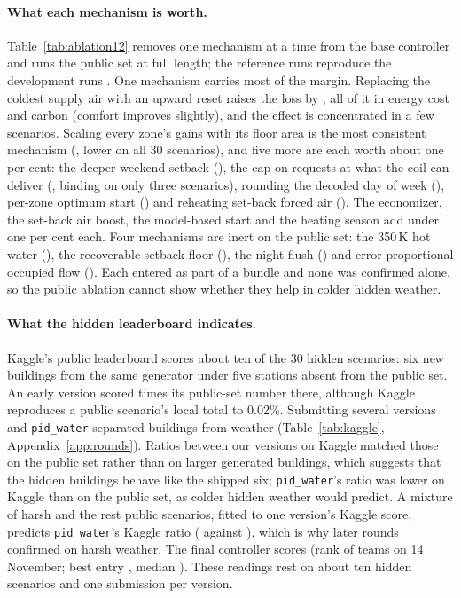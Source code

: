 \paragraph{What each mechanism is worth.} Table~\ref{tab:ablation12} removes one mechanism at a time from the base controller and runs the public set at full length; the reference runs reproduce the development runs \RElvAbRefMatch. One mechanism carries most of the margin. Replacing the coldest supply air with an upward reset raises the loss by \RElvAbSatRel, all of it in energy cost and carbon (comfort improves slightly), and the effect is concentrated in a few scenarios. Scaling every zone's gains with its floor area is the most consistent mechanism (\RElvAbNoareaRel, lower on all 30 scenarios), and five more are each worth about one per cent: the deeper weekend setback (\RElvAbNoweekendRel), the cap on requests at what the coil can deliver (\RElvAbNowcapRel, binding on only three scenarios), rounding the decoded day of week (\RElvAbNodowRel), per-zone optimum start (\RElvAbNozoneRel) and reheating set-back forced air (\RElvAbNoneutralRel). The economizer, the set-back air boost, the model-based start and the heating season add under one per cent each. Four mechanisms are inert on the public set: the 350\,K hot water (\RElvAbTwRel), the recoverable setback floor (\RElvAbNofloorRel), the night flush (\RElvAbNoflushRel) and error-proportional occupied flow (\RElvAbNooccdynRel). Each entered as part of a bundle and none was confirmed alone, so the public ablation cannot show whether they help in colder hidden weather.



\paragraph{What the hidden leaderboard indicates.} Kaggle's public leaderboard scores about ten of the 30 hidden scenarios: six new buildings from the same generator under five stations absent from the public set. An early version scored \RFiveKagGapPub{} times its public-set number there, although Kaggle reproduces a public scenario's local total to 0.02\%. Submitting several versions and \texttt{pid\_water} separated buildings from weather (Table~\ref{tab:kaggle}, Appendix~\ref{app:rounds}). Ratios between our versions on Kaggle matched those on the public set rather than on larger generated buildings, which suggests that the hidden buildings behave like the shipped six; \texttt{pid\_water}'s ratio was lower on Kaggle than on the public set, as colder hidden weather would predict. A mixture of \RSixMixWPct{} harsh and the rest public scenarios, fitted to one version's Kaggle score, predicts \texttt{pid\_water}'s Kaggle ratio (\RSixMixPid{} against \RSixKagRatioPid), which is why later rounds confirmed on harsh weather. The final controller scores \RFtKagVFourteen{} (rank \FinKagRank{} of \FinKagTeams{} teams on 14 November; best entry \FinKagBest, median \FinKagMedian). These readings rest on about ten hidden scenarios and one submission per version.

